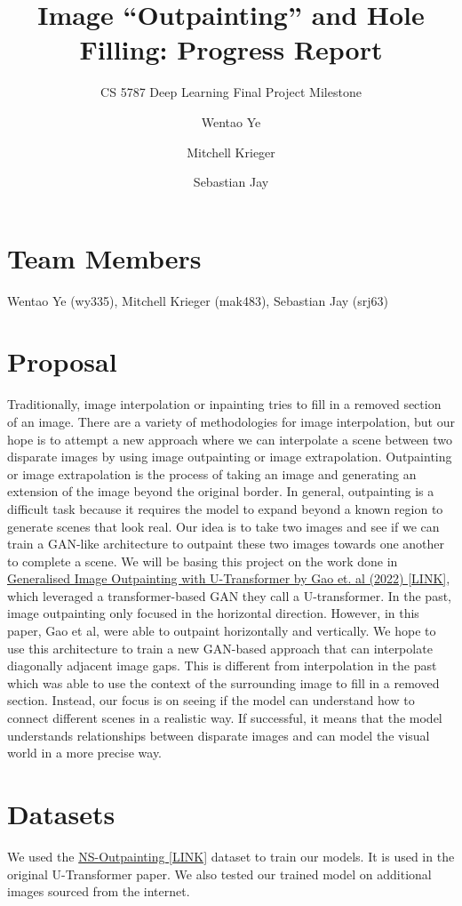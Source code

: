 \documentclass[sigconf]{acmart}
\title{Image “Outpainting” and Hole Filling: Progress Report}
\subtitle{CS 5787 Deep Learning Final Project Milestone}
\author{Wentao Ye}
\affiliation{%
  \institution{Cornell University}
}
\author{Mitchell Krieger}
\affiliation{%
  \institution{Cornell University}
}
\author{Sebastian Jay}
\affiliation{%
  \institution{Cornell University}
}
\begin{document}
\maketitle

\section*{Team Members}
Wentao Ye (wy335), Mitchell Krieger (mak483), Sebastian Jay (srj63)

\section*{Proposal}
Traditionally, image interpolation or inpainting tries to fill in a removed section of an image. There are a variety of methodologies for image interpolation, but our hope is to attempt a new approach where we can interpolate a scene between two disparate images by using image outpainting or image extrapolation. Outpainting or image extrapolation is the process of taking an image and generating an extension of the image beyond the original border. In general, outpainting is a difficult task because it requires the model to expand beyond a known region to generate scenes that look real. Our idea is to take two images and see if we can train a GAN-like architecture to outpaint these two images towards one another to complete a scene. We will be basing this project on the work done in \href{https://arxiv.org/abs/2201.11403}{Generalised Image Outpainting with U-Transformer by Gao et. al (2022) [LINK]}, which leveraged a transformer-based GAN they call a U-transformer. In the past, image outpainting only focused in the horizontal direction. However, in this paper, Gao et al, were able to outpaint horizontally and vertically. We hope to use this architecture to train a new GAN-based approach that can interpolate diagonally adjacent image gaps. This is different from interpolation in the past which was able to use the context of the surrounding image to fill in a removed section. Instead, our focus is on seeing if the model can understand how to connect different scenes in a realistic way. If successful, it means that the model understands relationships between disparate images and can model the visual world in a more precise way.

\section*{Datasets}
We used the \href{https://github.com/z-x-yang/NS-Outpainting}{NS-Outpainting [LINK]} dataset to train our models. It is used in the original U-Transformer paper. We also tested our trained model on additional images sourced from the internet.
\end{document}
